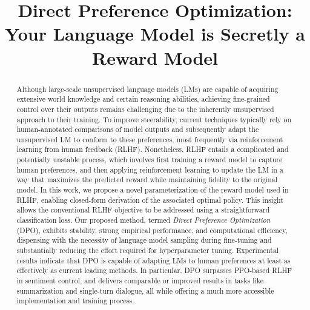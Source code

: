 \title{Direct Preference Optimization: Your Language Model is Secretly a Reward Model}

\begin{abstract}
Although large-scale unsupervised language models (LMs) are capable of acquiring extensive world knowledge and certain reasoning abilities, achieving fine-grained control over their outputs remains challenging due to the inherently unsupervised approach to their training. To improve steerability, current techniques typically rely on human-annotated comparisons of model outputs and subsequently adapt the unsupervised LM to conform to these preferences, most frequently via reinforcement learning from human feedback (RLHF). Nonetheless, RLHF entails a complicated and potentially unstable process, which involves first training a reward model to capture human preferences, and then applying reinforcement learning to update the LM in a way that maximizes the predicted reward while maintaining fidelity to the original model. In this work, we propose a novel parameterization of the reward model used in RLHF, enabling closed-form derivation of the associated optimal policy. This insight allows the conventional RLHF objective to be addressed using a straightforward classification loss. Our proposed method, termed \textit{Direct Preference Optimization} (DPO), exhibits stability, strong empirical performance, and computational efficiency, dispensing with the necessity of language model sampling during fine-tuning and substantially reducing the effort required for hyperparameter tuning. Experimental results indicate that DPO is capable of adapting LMs to human preferences at least as effectively as current leading methods. In particular, DPO surpasses PPO-based RLHF in sentiment control, and delivers comparable or improved results in tasks like summarization and single-turn dialogue, all while offering a much more accessible implementation and training process.
\end{abstract}

